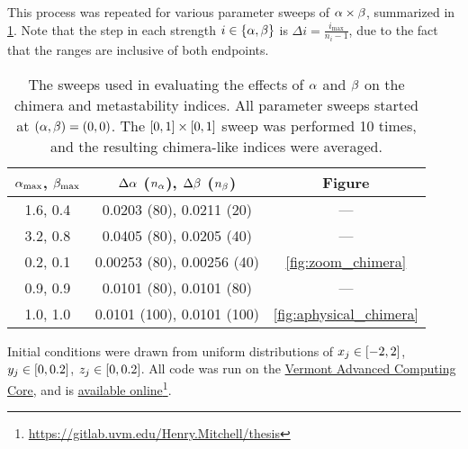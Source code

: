 This process was repeated for various parameter sweeps of $\alpha \times \beta$, summarized in \cref{tab:parameter_sweeps}.
Note that the step in each strength $i \in \Bqty{\hra, \hrb}$ is $\Delta i = \frac{i_{\text{max}}}{n_{i} - 1}$, due to the fact that the ranges are inclusive of both endpoints.
\begin{table}[ht]
  \centering
  \begin{tabular}{c | c | c}
    $\alpha_{\text{max}}$, $\beta_{\text{max}}$ & $\Delta \alpha$ ($n_{\alpha}$), $\Delta \beta$ ($n_{\beta}$) & Figure \\ \hline
    1.6, 0.4 & 0.0203 (80), 0.0211 (20) & --- \\
    3.2, 0.8 & 0.0405 (80), 0.0205 (40) & --- \\
    0.2, 0.1 & 0.00253 (80), 0.00256 (40) & \cref{fig:zoom_chimera} \\
    0.9, 0.9 & 0.0101 (80), 0.0101 (80) & --- \\
    1.0, 1.0 & 0.0101 (100), 0.0101 (100) & \cref{fig:aphysical_chimera}
  \end{tabular}
  \caption[Parameter sweeps]{The sweeps used in evaluating the effects of $\alpha$ and $\beta$ on the chimera and metastability indices.
    All parameter sweeps started at $(\alpha, \beta) = (0, 0)$.
    The $\bqty{0, 1} \times \bqty{0, 1}$ sweep was performed 10 times, and the resulting chimera-like indices were averaged.
  }
  \label{tab:parameter_sweeps}
\end{table}

Initial conditions were drawn from uniform distributions of $x_{j} \in \bqty{-2, 2}$, $y_{j} \in \bqty{0, 0.2}$, $z_{j} \in \bqty{0, 0.2}$.
All code was run on the \href{https://www.uvm.edu/vacc}{Vermont Advanced Computing Core}, and is \href{https://gitlab.uvm.edu/Henry.Mitchell/thesis}{available online}\footnote{\href{https://gitlab.uvm.edu/Henry.Mitchell/thesis}{https://gitlab.uvm.edu/Henry.Mitchell/thesis}}.

